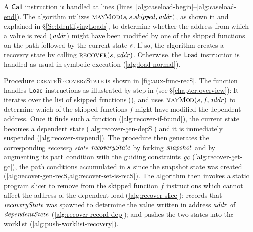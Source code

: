\subsection{}
A $\mathsf{Call}$ instruction is handled
at lines {(lines~\ref{alg:caseload-begin}--\ref{alg:caseload-end})}.
The algorithm utilizes
$\Call{mayMod}{\workstate,\workstate.\skipped,\addr}$, as shown in
 and explained in
\S\ref{Se:IdentifyingLoads}, to determine whether the address from
which a value is read ($\mathit{addr}$) might have been modified by one of the
skipped functions on the path followed by the current state
$s$.
If so, the algorithm creates a recovery state by
calling $\Call{recover}{\workstate,\addr}$.  Otherwise, the
$\mathsf{Load}$ instruction is handled as usual in symbolic
execution (\cref{alg:load-normal}).

Procedure \textsc{createRecoveryState} is shown in
\ref{fig:aux-func-recS}. The function handles $\mathsf{Load}$
instructions as illustrated by step  in 
(see \S\ref{chapter:overview}): It iterates over the list of skipped
functions (), and uses
$\Call{mayMod}{\workstate, f, \addr}$ to determine which of the skipped
functions $f$ might have modified the dependent address. Once it finds
such a function (\cref{alg:recover-if-found}), the current state
becomes a dependent state (\cref{alg:recover-gen-depS}) and it is
immediately suspended (\cref{alg:recover-suspend}). The procedure then
generates the corresponding \emph{recovery state} $\mathit{recoveryState}$ by
forking $\mathit{snapshot}$ and by augmenting its path condition with the
guiding constraints $\mathit{gc}$ (\cref{alg:recover-get-gc}), \ie the path
conditions accumulated in $s$ since the snapshot state was
created (\cref{alg:recover-gen-recS,alg:recover-set-is-recS}). The
algorithm then invokes a static program slicer to remove from the
skipped function $f$ instructions which cannot affect the address of
the dependent load (\cref{alg:recover-slice}); records that
$\mathit{recoveryState}$ was spawned to determine the value written in address
$\mathit{addr}$ of $\mathit{dependentState}$ (\cref{alg:recover-record-dep}); and
pushes the two states into the worklist
(\cref{alg:push-worklist-recovery}).

\subsection{}

